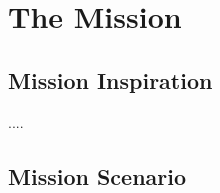 %
%
%
\chapter{The Mission}
\label{chap:mission}

\section{Mission Inspiration}
\label{sec:inspiration}
....



\section{Mission Scenario}
\label{sec:scenario}



